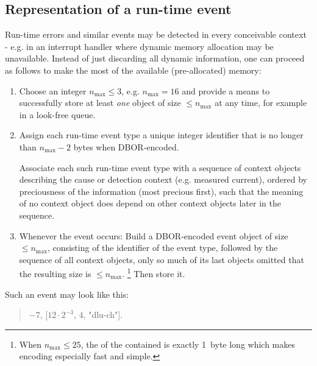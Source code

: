 \subsection{Representation of a run-time event}

Run-time errors and similar events may be detected in every conceivable context -
e.g. in an interrupt handler where dynamic memory allocation may be unavailable.
Instead of just discarding all dynamic information, one can proceed as follows to make the most of the available
(pre-allocated) memory:

\begin{enumerate}
    \item
    Choose an integer $n_{\text{max}} \le 3$, e.g. $n_{\text{max}} = 16$ and provide a means to successfully store at
    least \emph{one} object of size $\le n_{\text{max}}$ at any time, for example in a look-free queue.

    \item
    Assign each run-time event type a unique integer identifier that is no longer than $n_{\text{max}} - 2$ bytes
    when DBOR-encoded.

    Associate each such run-time event type with a sequence of context objects describing the cause or detection context
    (e.g. measured current), ordered by preciousness of the information (most precious first), such that the meaning
    of no context object does depend on other context objects later in the sequence.

    \item
    Whenever the event occurs:
    Build a DBOR-encoded event object of size $\le n_{\text{max}}$, consisting of the identifier of the event type,
    followed by the sequence of all context objects, only so much of its last objects
    omitted that the resulting size is $\le n_{\text{max}}$.%
    \footnote{%
        When $n_{\text{max}} \le 25$, the \DborIntegerToken{} of the contained \DborSequenceValue{}
        is exactly 1~byte long which makes encoding especially fast and simple.
    }
    Then store it.
\end{enumerate}

\begin{BeginParPenalty}
    Such an event may look like this:
    \begin{quote}
        $-7$, [$12 \cdot 2^{-3}$, $4$, "dlu-ch"].
    \end{quote}
\end{BeginParPenalty}

